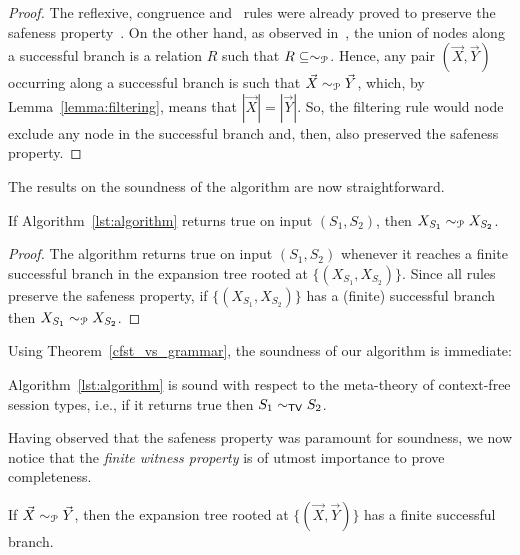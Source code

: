 \begin{proof}
	The reflexive, congruence and \BPA\ rules were already proved to 
	preserve the safeness property~\cite{janvcar1999techniques}.
	On the other hand, as observed in~\cite{janvcar1999techniques},
	the union of nodes along a successful branch is a relation $R$ 
	such that $R\subseteq \sim_{\mathcal{P}}$. Hence, any pair $(\vec X, \vec Y)$ 
	occurring along a successful branch is such that $\vec X \sim_{\mathcal{P}} \vec Y$,
	which, by Lemma~\ref{lemma:filtering}, means that $|\vec X|=|\vec Y|$.
	So, the filtering rule would node exclude any node in the successful branch
	and, then, also preserved the safeness property.
\end{proof}

The results on the soundness of the algorithm are now straightforward. 

\begin{theorem}
	If Algorithm~\ref{lst:algorithm} returns \textsf{true} on input 
	$(S_1,S_2)$, then $X_{S_1} \sim_{\mathcal{P}} X_{S_2}$.
\end{theorem}

\begin{proof}
	The algorithm returns \textsf{true} on input $(S_1,S_2)$ whenever 
	it reaches a finite successful branch in the expansion tree rooted 
	at $\{(X_{S_1}, X_{S_2})\}$. Since all rules preserve the safeness 
	property, if $\{(X_{S_1}, X_{S_2})\}$ has a (finite) successful 
	branch then $X_{S_1} \sim_{\mathcal{P}} X_{S_2}$.
\end{proof}

Using Theorem~\ref{cfst_vs_grammar}, the soundness of our algorithm is 
immediate:

\begin{theorem}
	Algorithm~\ref{lst:algorithm} is sound with respect to the meta-theory 
	of context-free session types, i.e., if it returns \textsf{true} then $S_1 \sim_{\mathsf{TV}} S_2$.
\end{theorem}

Having observed that the safeness property was paramount for soundness, 
we now notice that the \emph{finite witness property} is of utmost 
importance to prove completeness.

\begin{proposition} 
\label{finite_witness}
	If $\vec X \sim_{\mathcal{P}} \vec Y$, then the expansion tree rooted at 
	$\{(\vec X, \vec Y)\}$ has a finite successful branch.
\end{proposition}

